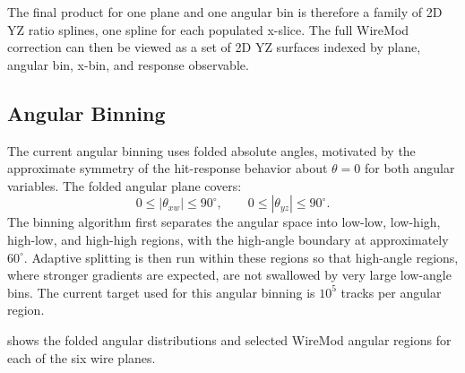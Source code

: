 \documentclass{article}
\begin{document}
The final product for one plane and one angular bin is therefore a family of 2D YZ ratio splines, one spline for each populated x-slice. The full WireMod correction can then be viewed as a set of 2D YZ surfaces indexed by plane, angular bin, x-bin, and response observable.

\subsection{Angular Binning}

The current angular binning uses folded absolute angles, motivated by the approximate symmetry of the hit-response behavior about $\theta=0$ for both angular variables. The folded angular plane covers:
\begin{equation}
    0 \leq |\theta_{xw}| \leq 90^\circ,
    \qquad
    0 \leq |\theta_{yz}| \leq 90^\circ.
\end{equation}
The binning algorithm first separates the angular space into low-low, low-high, high-low, and high-high regions, with the high-angle boundary at approximately $60^\circ$. Adaptive splitting is then run within these regions so that high-angle regions, where stronger gradients are expected, are not swallowed by very large low-angle bins. The current target used for this angular binning is $10^{5}$ tracks per angular region.

 shows the folded angular distributions and selected WireMod angular regions for each of the six wire planes.
\end{document}
